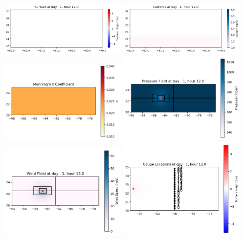 \documentclass[11pt]{article}
\begin{document}
\vskip 10pt 
\includegraphics[width=0.475\textwidth]{frame0006fig1003.png}
\includegraphics[width=0.475\textwidth]{frame0006fig1004.png}
\vskip 10pt 
\includegraphics[width=0.475\textwidth]{frame0006fig1005.png}
\includegraphics[width=0.475\textwidth]{frame0006fig1006.png}
\vskip 10pt 
\includegraphics[width=0.475\textwidth]{frame0006fig1007.png}
\includegraphics[width=0.475\textwidth]{frame0006fig1008.png}
\end{document}
